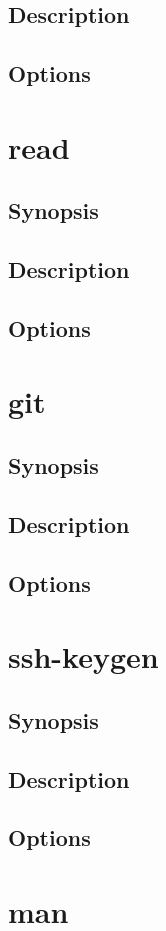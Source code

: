 \documentclass[a4paper, 10pt, onecolumn, openright, oneside]{book}
\begin{document}
			\subsection{Description}
			\subsection{Options}
		\section{read}
			\subsection{Synopsis}
			\subsection{Description}
			\subsection{Options}
		\section{git}
			\subsection{Synopsis}
			\subsection{Description}
			\subsection{Options}
		\section{ssh-keygen}
			\subsection{Synopsis}
			\subsection{Description}
			\subsection{Options}
		\section{man}
\end{document}
